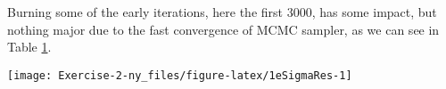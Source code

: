 \documentclass[
]{article}
\newenvironment{Shaded}{\begin{snugshade}}{\end{snugshade}}
\newcommand{\AttributeTok}[1]{\textcolor[rgb]{0.77,0.63,0.00}{#1}}
\newcommand{\DecValTok}[1]{\textcolor[rgb]{0.00,0.00,0.81}{#1}}
\newcommand{\FunctionTok}[1]{\textcolor[rgb]{0.00,0.00,0.00}{#1}}
\newcommand{\NormalTok}[1]{#1}
\newcommand{\OtherTok}[1]{\textcolor[rgb]{0.56,0.35,0.01}{#1}}
\newcommand{\SpecialCharTok}[1]{\textcolor[rgb]{0.00,0.00,0.00}{#1}}
\newcommand{\StringTok}[1]{\textcolor[rgb]{0.31,0.60,0.02}{#1}}
\begin{document}
Burning some of the early iterations, here the first 3000, has some impact, but nothing major due to the fast convergence of MCMC sampler, as we can see in Table \href{tab:1eburn}{1}.

\begin{Shaded}
\end{Shaded}

\begin{center}\texttt{[image: Exercise-2-ny\_files/figure-latex/1eSigmaRes-1]} \end{center}
\end{document}
